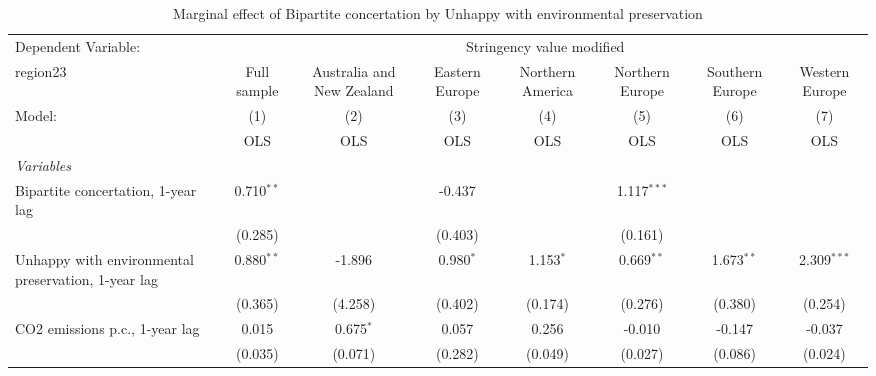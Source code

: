 
\begin{table}[htbp]
   \caption{Marginal effect of Bipartite concertation by Unhappy with environmental preservation}
   \centering
   \begin{tabular}{lccccccc}
      \toprule
      Dependent Variable: & \multicolumn{7}{c}{Stringency value modified}\\
      region23                                                                                 & Full sample    & Australia and New Zealand & Eastern Europe & Northern America & Northern Europe & Southern Europe & Western Europe \\   
      Model:                                                                                   & (1)            & (2)                       & (3)            & (4)              & (5)             & (6)             & (7)\\  
                                                                                               &  OLS           & OLS                       & OLS            & OLS              & OLS             & OLS             & OLS\\  
      \midrule
      \emph{Variables}\\
      Bipartite concertation, 1-year lag                                                       & 0.710$^{**}$   &                           & -0.437         &                  & 1.117$^{***}$   &                 &   \\   
                                                                                               & (0.285)        &                           & (0.403)        &                  & (0.161)         &                 &   \\   
      Unhappy with environmental preservation, 1-year lag                                      & 0.880$^{**}$   & -1.896                    & 0.980$^{*}$    & 1.153$^{*}$      & 0.669$^{**}$    & 1.673$^{**}$    & 2.309$^{***}$\\   
                                                                                               & (0.365)        & (4.258)                   & (0.402)        & (0.174)          & (0.276)         & (0.380)         & (0.254)\\   
      CO2 emissions p.c., 1-year lag                                                           & 0.015          & 0.675$^{*}$               & 0.057          & 0.256            & -0.010          & -0.147          & -0.037\\   
                                                                                               & (0.035)        & (0.071)                   & (0.282)        & (0.049)          & (0.027)         & (0.086)         & (0.024)\\   

\end{tabular}
\end{table}
